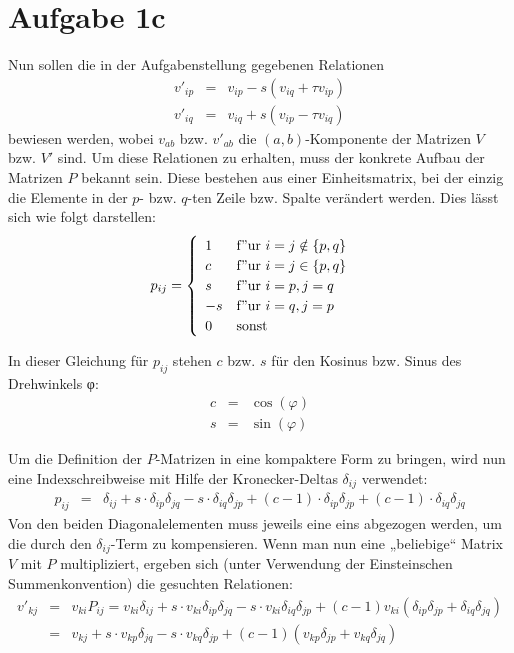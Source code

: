 \section*{Aufgabe 1c}

Nun sollen die in der Aufgabenstellung gegebenen Relationen
\begin{eqnarray}
v'_{ip} &=& v_{ip} - s(v_{iq} + τv_{ip})\\
v'_{iq} &=& v_{iq} + s(v_{ip} - τv_{iq})
\end{eqnarray}
bewiesen werden, wobei $v_{ab}$ bzw. $v'_{ab}$ die $(a,b)$-Komponente der
Matrizen $V$ bzw. $V'$ sind. Um diese Relationen zu erhalten, muss der
konkrete Aufbau der Matrizen $P$ bekannt sein. Diese bestehen aus einer
Einheitsmatrix, bei der einzig die Elemente in der $p$- bzw. $q$-ten Zeile bzw.
Spalte verändert werden. Dies lässt sich wie folgt darstellen:
\begin{equation}
p_{ij} = \begin{cases}\begin{array}[h]{ll}
1 & \mathrm{f"ur~} i=j \notin \{p,q\} \\c & \mathrm{f"ur~} i=j \in \{p,q\}\\s &
\mathrm{f"ur~} i=p, j=q\\-s & \mathrm{f"ur~} i=q, j=p\\0 & \mathrm{sonst}
\end{array}\end{cases}
\end{equation}

In dieser Gleichung für $p_{ij}$ stehen $c$ bzw. $s$ für den Kosinus bzw. Sinus
des Drehwinkels φ:
\begin{eqnarray}
c &=& \cos(φ)\\
s &=& \sin(φ)
\end{eqnarray}

Um die Definition der $P$-Matrizen in eine kompaktere Form zu bringen, wird nun
eine Indexschreibweise mit Hilfe der Kronecker-Deltas $δ_{ij}$ verwendet:
\begin{eqnarray}
p_{ij} &=& δ_{ij} + s\cdot δ_{ip}δ_{jq} - s\cdot δ_{iq}δ_{jp} + (c-1)\cdot
δ_{ip}δ_{jp} + (c-1)\cdot δ_{iq}δ_{jq}
\end{eqnarray}
Von den beiden Diagonalelementen muss jeweils eine eins abgezogen werden, um
die durch den $δ_{ij}$-Term zu kompensieren. Wenn man nun eine „beliebige“
Matrix $V$ mit $P$ multipliziert, ergeben sich (unter Verwendung der
Einsteinschen Summenkonvention) die gesuchten Relationen:
\begin{eqnarray}
v'_{kj} &=& v_{ki} P_{ij} = v_{ki}δ_{ij} + s\cdot v_{ki}δ_{ip}δ_{jq} - s\cdot
v_{ki}δ_{iq}δ_{jp} + (c-1)v_{ki}(δ_{ip}δ_{jp} + δ_{iq}δ_{jq})\\
&=& v_{kj} + s\cdot v_{kp}δ_{jq} - s\cdot v_{kq}δ_{jp} + (c-1)(v_{kp}δ_{jp} +
v_{kq}δ_{jq})
\end{eqnarray}

